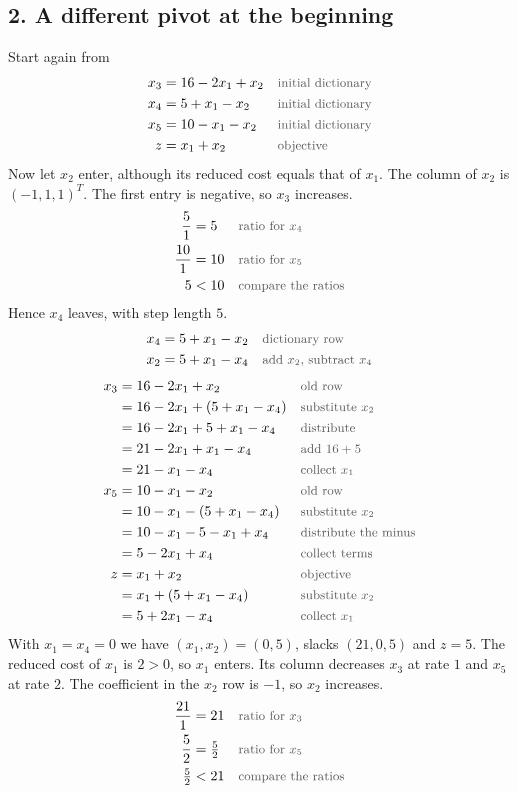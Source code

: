 \documentclass[a4paper,11pt]{article}
\newcommand{\teil}[1]{\subsection*{#1}}
\newcommand{\why}[1]{\text{\small\color{black!65}#1}}
\begin{document}
\teil{2. A different pivot at the beginning}
Start again from
\begin{align*}
x_3&=16-2x_1+x_2&&\why{initial dictionary}\\
x_4&=5+x_1-x_2&&\why{initial dictionary}\\
x_5&=10-x_1-x_2&&\why{initial dictionary}\\
z&=x_1+x_2&&\why{objective}
\end{align*}
Now let $x_2$ enter, although its reduced cost equals that of $x_1$. The column of $x_2$ is $(-1,1,1)^T$. The first entry is negative, so $x_3$ increases.
\begin{align*}
\frac{5}{1}&=5&&\why{ratio for $x_4$}\\
\frac{10}{1}&=10&&\why{ratio for $x_5$}\\
5&<10&&\why{compare the ratios}
\end{align*}
Hence $x_4$ leaves, with step length $5$.
\begin{align*}
x_4&=5+x_1-x_2&&\why{dictionary row}\\
x_2&=5+x_1-x_4&&\why{add $x_2$, subtract $x_4$}
\end{align*}
\begin{align*}
x_3&=16-2x_1+x_2&&\why{old row}\\
&=16-2x_1+(5+x_1-x_4)&&\why{substitute $x_2$}\\
&=16-2x_1+5+x_1-x_4&&\why{distribute}\\
&=21-2x_1+x_1-x_4&&\why{add $16+5$}\\
&=21-x_1-x_4&&\why{collect $x_1$}\\
x_5&=10-x_1-x_2&&\why{old row}\\
&=10-x_1-(5+x_1-x_4)&&\why{substitute $x_2$}\\
&=10-x_1-5-x_1+x_4&&\why{distribute the minus}\\
&=5-2x_1+x_4&&\why{collect terms}\\
z&=x_1+x_2&&\why{objective}\\
&=x_1+(5+x_1-x_4)&&\why{substitute $x_2$}\\
&=5+2x_1-x_4&&\why{collect $x_1$}
\end{align*}
With $x_1=x_4=0$ we have $(x_1,x_2)=(0,5)$, slacks $(21,0,5)$ and $z=5$. The reduced cost of $x_1$ is $2>0$, so $x_1$ enters. Its column decreases $x_3$ at rate $1$ and $x_5$ at rate $2$. The coefficient in the $x_2$ row is $-1$, so $x_2$ increases.
\begin{align*}
\frac{21}{1}&=21&&\why{ratio for $x_3$}\\
\frac{5}{2}&=\tfrac52&&\why{ratio for $x_5$}\\
\tfrac52&<21&&\why{compare the ratios}
\end{align*}
\end{document}
